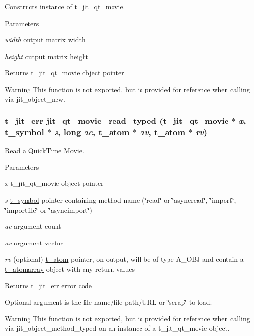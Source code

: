 Constructs instance of t\_\-jit\_\-qt\_\-movie. 
\begin{DoxyParams}{Parameters}
\item[{\em width}]output matrix width \item[{\em height}]output matrix height\end{DoxyParams}
\begin{DoxyReturn}{Returns}
t\_\-jit\_\-qt\_\-movie object pointer
\end{DoxyReturn}
\begin{DoxyWarning}{Warning}
This function is not exported, but is provided for reference when calling via jit\_\-object\_\-new. 
\end{DoxyWarning}
\hypertarget{group__qtmoviemod_ga2218192fcdfb3f999a7097b719d75c78}{
\subsubsection[{jit\_\-qt\_\-movie\_\-read\_\-typed}]{\setlength{\rightskip}{0pt plus 5cm}t\_\-jit\_\-err jit\_\-qt\_\-movie\_\-read\_\-typed (t\_\-jit\_\-qt\_\-movie $\ast$ {\em x}, \/  {\bf t\_\-symbol} $\ast$ {\em s}, \/  long {\em ac}, \/  {\bf t\_\-atom} $\ast$ {\em av}, \/  {\bf t\_\-atom} $\ast$ {\em rv})}}
\label{group__qtmoviemod_ga2218192fcdfb3f999a7097b719d75c78}


Read a QuickTime Movie. 
\begin{DoxyParams}{Parameters}
\item[{\em x}]t\_\-jit\_\-qt\_\-movie object pointer \item[{\em s}]\hyperlink{structt__symbol}{t\_\-symbol} pointer containing method name (\char`\"{}read\char`\"{} or \char`\"{}asyncread\char`\"{}, \char`\"{}import\char`\"{}, \char`\"{}importfile\char`\"{} or \char`\"{}asyncimport\char`\"{}) \item[{\em ac}]argument count \item[{\em av}]argument vector \item[{\em rv}](optional) \hyperlink{structt__atom}{t\_\-atom} pointer, on output, will be of type A\_\-OBJ and contain a \hyperlink{structt__atomarray}{t\_\-atomarray} object with any return values\end{DoxyParams}
\begin{DoxyReturn}{Returns}
t\_\-jit\_\-err error code
\end{DoxyReturn}
Optional argument is the file name/file path/URL or \char`\"{}scrap\char`\"{} to load.

\begin{DoxyWarning}{Warning}
This function is not exported, but is provided for reference when calling via jit\_\-object\_\-method\_\-typed on an instance of a t\_\-jit\_\-qt\_\-movie object. 
\end{DoxyWarning}
